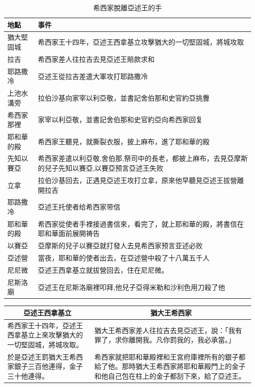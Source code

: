 \begin{table}[!hbp]
\centering
\begin{tabular}{|p{2cm}||p{13cm}|}
\hline
\hline
  地點   & 事件  \\\hline\hline
 猶大堅固城  & 希西家王十四年，亞述王西拿基立攻擊猶大的一切堅固城，將城攻取  \\\hline
拉吉 & 希西家差人往拉吉去見亞述王賠款求和   \\\hline
耶路撒冷    & 亞述王從拉吉差遣大軍攻打耶路撒冷 \\\hline
上池水溝旁    & 拉伯沙基向家宰以利亞敬，並書記舍伯那和史官約亞挑釁 \\\hline
希西家那裡    & 家宰以利亞敬，並書記舍伯那和史官約亞向希西家回复 \\\hline
耶和華的殿    & 希西家王聽見，就撕裂衣服，披上麻布，進了耶和華的殿 \\\hline
先知以賽亞    &希西家差遣以利亞敬,舍伯那,祭司中的長老，都披上麻布，去見亞摩斯的兒子先知以賽亞,以賽亞预言亞述王失败 \\\hline
立拿    & 拉伯沙基回去，正遇見亞述王攻打立拿，原來他早聽見亞述王拔營離開拉吉 \\\hline
  耶路撒冷   & 亞述王托使者给希西家带信 \\\hline
耶和華的殿    & 希西家從使者手裡接過書信來，看完了，就上耶和華的殿，將書信在耶和華面前展開祷告 \\\hline
以賽亞    & 亞摩斯的兒子以賽亞就打發人去見希西家预言亚述必败 \\\hline
亞述營    & 當夜，耶和華的使者出去，在亞述營中殺了十八萬五千人 \\\hline
尼尼微    & 亞述王西拿基立就拔營回去，住在尼尼微。 \\\hline
尼斯洛廟    & 亞述王在尼斯洛廟裡叩拜,他兒子亞得米勒和沙利色用刀殺了他 \\\hline
\end{tabular}
\caption{希西家脫離亞述王的手}
\end{table}

\begin{table}[H]
\centering
\begin{tabular}{p{5.75cm}|p{11.75cm}}\hline\hline
\multicolumn{1}{c|}{亞述王西拿基立}&\multicolumn{1}{c}{猶大王希西家}\\\hline
希西家王十四年，亞述王西拿基立上來攻擊猶大的一切堅固城，將城攻取。
&猶大王希西家差人往拉吉去見亞述王，說：「我有罪了，求你離開我。凡你罰我的，我必承當。」\\\hline
於是亞述王罰猶大王希西家銀子三百他連得，金子三十他連得。&希西家就把耶和華殿裡和王宮府庫裡所有的銀子都給了他。那時猶大王希西家將耶和華殿門上的金子和他自己包在柱上的金子都刮下來，給了亞述王。\\\hline
\end{tabular}
\end{table}


